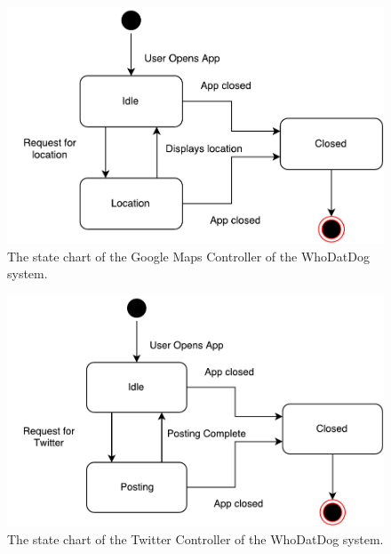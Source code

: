 \documentclass[]{article}
\begin{document}
\begin{figure}[H]
	\centering
	\includegraphics[width=\textwidth]{GoogleMapsController.pdf}
	\caption{\label{fig:analysisclassdiagram}The state chart of the Google Maps Controller of the WhoDatDog system.}
\end{figure}


\begin{figure}[H]
	\centering
	\includegraphics[width=\textwidth]{TwitterController.pdf}
	\caption{\label{fig:analysisclassdiagram}The state chart of the Twitter Controller of the WhoDatDog system.}
\end{figure}
\end{document}
